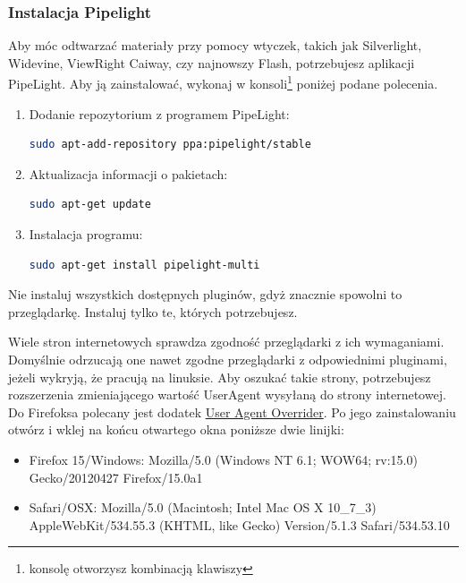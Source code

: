\subsubsection{Instalacja Pipelight}
Aby móc odtwarzać materiały przy pomocy wtyczek, takich jak Silverlight, Widevine, ViewRight Caiway, czy najnowszy Flash, potrzebujesz aplikacji PipeLight. Aby ją zainstalować, wykonaj w konsoli\footnote{konsolę otworzysz kombinacją klawiszy } poniżej podane polecenia.
\begin{enumerate}
\item Dodanie repozytorium z programem PipeLight:
\begin{lstlisting}[language=bash]
sudo apt-add-repository ppa:pipelight/stable
\end{lstlisting}
\item Aktualizacja informacji o pakietach:
\begin{lstlisting}[language=bash]
sudo apt-get update
\end{lstlisting}
\item Instalacja programu:
\begin{lstlisting}[language=bash]
sudo apt-get install pipelight-multi
\end{lstlisting}
\end{enumerate}

\noindent Nie instaluj wszystkich dostępnych pluginów, gdyż znacznie spowolni to przeglądarkę. Instaluj tylko te, których potrzebujesz.

Wiele stron internetowych sprawdza zgodność przeglądarki z ich wymaganiami. Domyślnie odrzucają one nawet zgodne przeglądarki z odpowiednimi pluginami, jeżeli wykryją, że pracują na linuksie. Aby oszukać takie strony, potrzebujesz rozszerzenia zmieniającego wartość \textcolor{ubuntu_orange}{UserAgent} wysyłaną do strony internetowej. Do Firefoksa polecany jest dodatek \href{https://addons.mozilla.org/pl-PL/firefox/addon/user-agent-overrider/}{User Agent Overrider}. Po jego zainstalowaniu otwórz  i wklej na końcu otwartego okna poniższe dwie linijki:
\begin{itemize}
\item Firefox 15/Windows: Mozilla/5.0 (Windows NT 6.1; WOW64; rv:15.0) Gecko/20120427 Firefox/15.0a1
\item Safari/OSX: Mozilla/5.0 (Macintosh; Intel Mac OS X 10\_7\_3) AppleWebKit/534.55.3 (KHTML, like Gecko) Version/5.1.3 Safari/534.53.10
\end{itemize}

